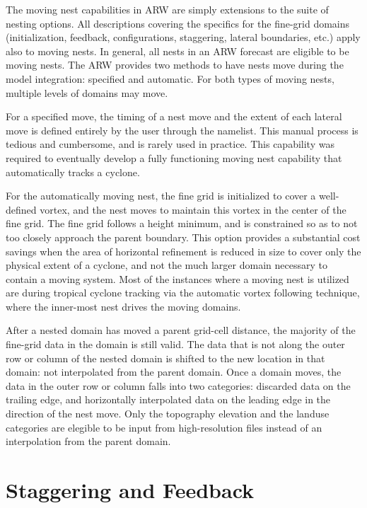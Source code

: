 The moving nest capabilities in ARW are simply extensions to the 
suite of nesting options.  All descriptions covering the 
specifics for the fine-grid
domains (initialization, feedback, configurations, staggering,
lateral boundaries, etc.) apply also to moving nests.  In
general, all nests
in an ARW forecast are eligible to be moving nests.  The ARW
provides two methods to have nests move during the model
integration: specified and automatic.
For both types of moving nests,
multiple levels of domains may move.  

For a specified move, the timing of a nest move and the extent
of each lateral move is defined entirely by the user through
the namelist. This manual process is tedious and cumbersome, and is 
rarely used in practice. This capability was required to eventually
develop a fully functioning moving nest capability that automatically 
tracks a cyclone.  

For the
automatically moving nest, the fine grid is initialized to cover
a well-defined vortex, and the nest moves to maintain this vortex
in the center of the fine grid. The fine grid follows a height 
minimum, and is constrained so as to not too closely approach 
the parent boundary. This option provides a substantial cost savings
when the area of horizontal refinement is reduced in 
size to cover only the physical extent of a cyclone, and not the 
much larger domain necessary to contain a moving system.
Most of the 
instances where a moving nest is utilized are during tropical
cyclone tracking via the automatic vortex following technique,
where the inner-most nest drives the moving domains.

After a nested domain has moved a parent grid-cell distance,
the majority of the fine-grid data in the domain is still valid.  The
data that is not along the outer row or column of the nested
domain is shifted to the new location in that domain: not interpolated
from the parent domain.
Once a domain moves, the data in the outer
row or column falls into two categories: discarded data on the
trailing edge, and horizontally interpolated data on the
leading edge in the direction of the nest move. 
Only the topography elevation and the landuse categories are elegible
to be input from high-resolution files instead of an interpolation
from the parent domain.

\section{Staggering and Feedback}

